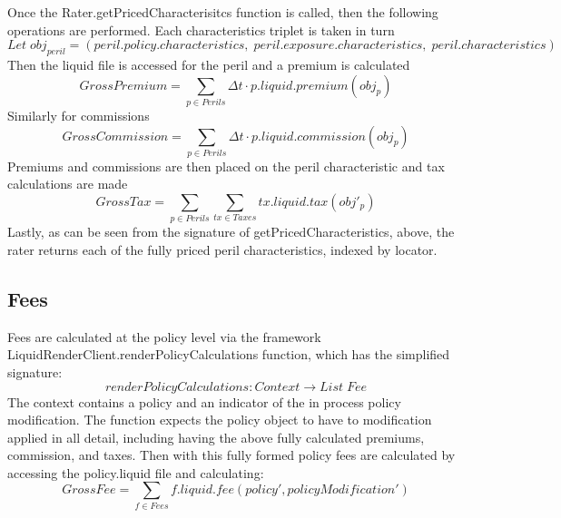 Once the Rater.getPricedCharacterisitcs function is called, then the following operations are performed. Each
characteristics triplet is taken in turn
\begin{equation*}
Let \; obj_{peril} = (peril.policy.characteristics, \; peril.exposure.characteristics, \; peril.characteristics)
\end{equation*}
Then the liquid file is accessed for the peril and a premium is calculated
\begin{equation*}
GrossPremium = \sum_{p \in Perils} \Delta t \cdot p.liquid.premium(obj_p) 
\end{equation*}
Similarly for commissions
\begin{equation*}
GrossCommission = \sum_{p \in Perils} \Delta t \cdot p.liquid.commission(obj_p)
\end{equation*}
Premiums and commissions are then placed on the peril characteristic and tax calculations are made
\begin{equation*}
  GrossTax = \sum_{p \in Perils} \sum_{tx \in Taxes} tx.liquid.tax(obj'_p) 
\end{equation*}
Lastly, as can be seen from the signature of getPricedCharacteristics, above, the rater returns each of the fully priced peril characteristics, indexed
by locator.

\subsection{Fees}
Fees are calculated at the policy level via the framework LiquidRenderClient.renderPolicyCalculations function, which has the
simplified signature:
\begin{equation*}
  renderPolicyCalculations: Context \to List \; Fee
\end{equation*}
The context contains a policy and an indicator of the in process policy modification. The function expects the policy object to
have to modification applied in all detail, including having the above fully calculated premiums, commission, and taxes.
Then with this fully formed policy fees are calculated by accessing the policy.liquid file and calculating:
\begin{equation*}
GrossFee = \sum_{f \in Fees} f.liquid.fee(policy', policyModification')
\end{equation*}

